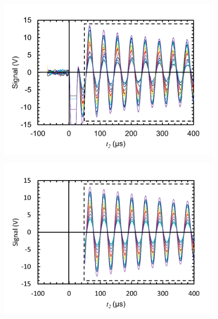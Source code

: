 \documentclass[11pt,dvipdfmx,a4paper]{jsarticle}
\begin{document}
\begin{figure}[h]
	\centering
	\begin{minipage}[t]{0.48\columnwidth}
		\centering
		\includegraphics[width=\columnwidth]{graph/relaxation_water_ex.png}
		\label{graph:water_ex}
	\end{minipage}
	\hfill
	\begin{minipage}[t]{0.48\columnwidth}
		\centering
		\includegraphics[width=\columnwidth]{graph/relaxation_water_fit.png}
		\label{graph:water_fit}
	\end{minipage}\\
	\begin{minipage}[t]{0.48\columnwidth}
		\centering

\end{minipage}
\end{figure}
\end{document}
